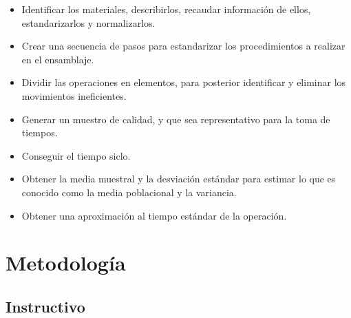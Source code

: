 \begin{itemize}
    \item Identificar los materiales, describirlos, recaudar información de ellos, estandarizarlos y normalizarlos.
    \item Crear una secuencia de pasos para estandarizar los procedimientos a realizar en el ensamblaje.
    \item Dividir las operaciones en elementos, para posterior identificar y eliminar los movimientos ineficientes.
    \item Generar un muestro de calidad, y que sea representativo para la toma de tiempos.
    \item Conseguir el tiempo siclo.
    \item Obtener la media muestral y la desviación estándar para estimar lo que es conocido como la media poblacional y la variancia.
    \item Obtener una aproximación al tiempo estándar de la operación.
    
\end{itemize}

% 

\section{Metodología}

\subsection{Instructivo}

